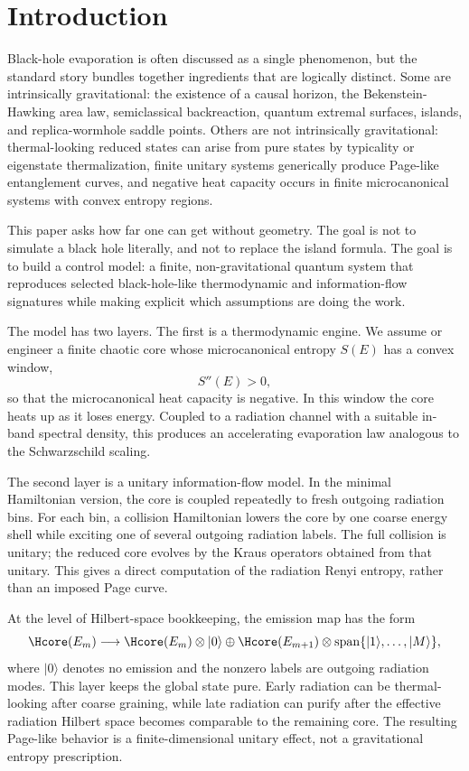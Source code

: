 \section{Introduction}

Black-hole evaporation is often discussed as a single phenomenon, but the standard story bundles together ingredients that are logically distinct. Some are intrinsically gravitational: the existence of a causal horizon, the Bekenstein-Hawking area law, semiclassical backreaction, quantum extremal surfaces, islands, and replica-wormhole saddle points. Others are not intrinsically gravitational: thermal-looking reduced states can arise from pure states by typicality or eigenstate thermalization, finite unitary systems generically produce Page-like entanglement curves, and negative heat capacity occurs in finite microcanonical systems with convex entropy regions.

This paper asks how far one can get without geometry. The goal is not to simulate a black hole literally, and not to replace the island formula. The goal is to build a control model: a finite, non-gravitational quantum system that reproduces selected black-hole-like thermodynamic and information-flow signatures while making explicit which assumptions are doing the work.

The model has two layers. The first is a thermodynamic engine. We assume or engineer a finite chaotic core whose microcanonical entropy $S(E)$ has a convex window,
\begin{equation}
  S''(E)>0,
\end{equation}
so that the microcanonical heat capacity is negative. In this window the core heats up as it loses energy. Coupled to a radiation channel with a suitable in-band spectral density, this produces an accelerating evaporation law analogous to the Schwarzschild scaling.

The second layer is a unitary information-flow model. In the minimal Hamiltonian version, the core is coupled repeatedly to fresh outgoing radiation bins. For each bin, a collision Hamiltonian lowers the core by one coarse energy shell while exciting one of several outgoing radiation labels. The full collision is unitary; the reduced core evolves by the Kraus operators obtained from that unitary. This gives a direct computation of the radiation Renyi entropy, rather than an imposed Page curve.

At the level of Hilbert-space bookkeeping, the emission map has the form
\begin{equation}
  \Hcore(E_m)\longrightarrow
  \Hcore(E_m)\otimes |0\rangle
  \oplus
  \Hcore(E_{m+1})\otimes {\rm span}\{|1\rangle,\ldots,|M\rangle\},
\end{equation}
where $|0\rangle$ denotes no emission and the nonzero labels are outgoing radiation modes. This layer keeps the global state pure. Early radiation can be thermal-looking after coarse graining, while late radiation can purify after the effective radiation Hilbert space becomes comparable to the remaining core. The resulting Page-like behavior is a finite-dimensional unitary effect, not a gravitational entropy prescription.

